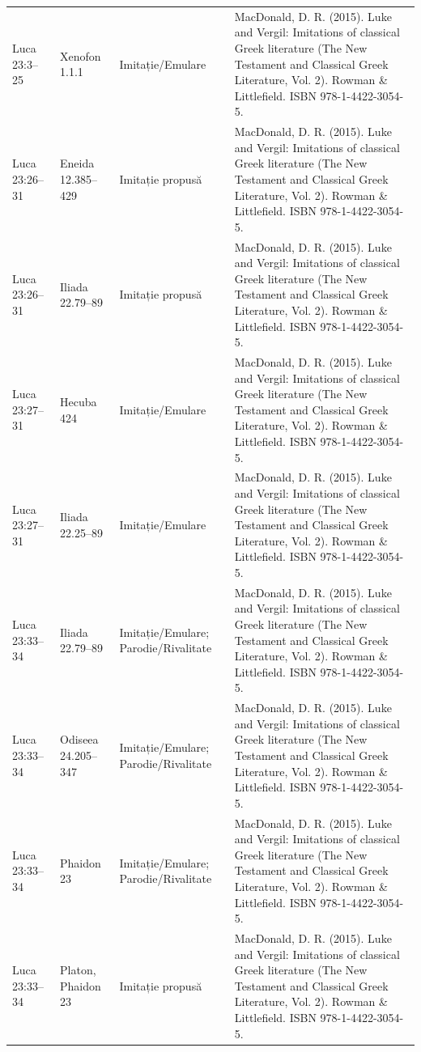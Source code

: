 \documentclass[12pt,a4paper,twoside,openany]{book}
\begin{document}
\begin{longtable}{L{1.4cm}L{1.7cm}L{3.1cm}L{8.4cm}}
Luca 23:3–25 & Xenofon 1.1.1 & Imitație/Emulare & MacDonald, D. R. (2015). Luke and Vergil: Imitations of classical Greek literature (The New Testament and Classical Greek Literature, Vol. 2). Rowman \& Littlefield. ISBN 978-1-4422-3054-5. \\
Luca 23:26–31 & Eneida 12.385–429 & Imitație propusă & MacDonald, D. R. (2015). Luke and Vergil: Imitations of classical Greek literature (The New Testament and Classical Greek Literature, Vol. 2). Rowman \& Littlefield. ISBN 978-1-4422-3054-5. \\
Luca 23:26–31 & Iliada 22.79–89 & Imitație propusă & MacDonald, D. R. (2015). Luke and Vergil: Imitations of classical Greek literature (The New Testament and Classical Greek Literature, Vol. 2). Rowman \& Littlefield. ISBN 978-1-4422-3054-5. \\
Luca 23:27–31 & Hecuba 424 & Imitație/Emulare & MacDonald, D. R. (2015). Luke and Vergil: Imitations of classical Greek literature (The New Testament and Classical Greek Literature, Vol. 2). Rowman \& Littlefield. ISBN 978-1-4422-3054-5. \\
Luca 23:27–31 & Iliada 22.25–89 & Imitație/Emulare & MacDonald, D. R. (2015). Luke and Vergil: Imitations of classical Greek literature (The New Testament and Classical Greek Literature, Vol. 2). Rowman \& Littlefield. ISBN 978-1-4422-3054-5. \\
Luca 23:33–34 & Iliada 22.79–89 & Imitație/Emulare; Parodie/Rivalitate & MacDonald, D. R. (2015). Luke and Vergil: Imitations of classical Greek literature (The New Testament and Classical Greek Literature, Vol. 2). Rowman \& Littlefield. ISBN 978-1-4422-3054-5. \\
Luca 23:33–34 & Odiseea 24.205–347 & Imitație/Emulare; Parodie/Rivalitate & MacDonald, D. R. (2015). Luke and Vergil: Imitations of classical Greek literature (The New Testament and Classical Greek Literature, Vol. 2). Rowman \& Littlefield. ISBN 978-1-4422-3054-5. \\
Luca 23:33–34 & Phaidon 23 & Imitație/Emulare; Parodie/Rivalitate & MacDonald, D. R. (2015). Luke and Vergil: Imitations of classical Greek literature (The New Testament and Classical Greek Literature, Vol. 2). Rowman \& Littlefield. ISBN 978-1-4422-3054-5. \\
Luca 23:33–34 & Platon, Phaidon 23 & Imitație propusă & MacDonald, D. R. (2015). Luke and Vergil: Imitations of classical Greek literature (The New Testament and Classical Greek Literature, Vol. 2). Rowman \& Littlefield. ISBN 978-1-4422-3054-5. \\

\end{longtable}
\end{document}
